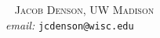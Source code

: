 \documentclass{article}
\DeclareMathOperator{\RR}{\mathbb{R}}
\theoremstyle{plain}
\theoremstyle{definition}
\begin{document}
\begin{comment}



\[ Tf_1(x) - Tf_2(x) = \sum_{j_0 \leq j \leq \log(1/\varepsilon)} \int K_j(x,y) [ f_1(y) - f_2(y) ]\; dy + \sum_{j > \log(1/\varepsilon)} \int K_j(x,y) [ f_1(y) - f_2(y) ] \]


if two functions $f_1$ and $f_2$ agree on a neighborhood of $x$, and $\widehat{f}_1$ and $\widehat{f}_2$ are supported on $\{ |\xi| \geq R \}$, then $|Tf_1(x) - Tf_2(x)| \lesssim_N R^{-N}$.




Notice that if $\widehat{f}$ is supported on $\{ \xi : R/2 \leq |\xi| \leq 2R \}$, then
%
\[ Tf(x) = R^d \int_{\RR^d} \sigma_R(x,\xi) \chi(\xi) \widehat{f}(R \xi) e^{2 \pi i R \xi \cdot x}\; d \xi. \]

$\{ R^{-t} \sigma_R \}$ are a uniformly bounded family of 

We have an asymptotic theory of 

\end{comment}






\ \newline
\noindent \textsc{Jacob Denson, UW Madison}\\
\textit{email:} \texttt{jcdenson@wisc.edu}
\end{document}
